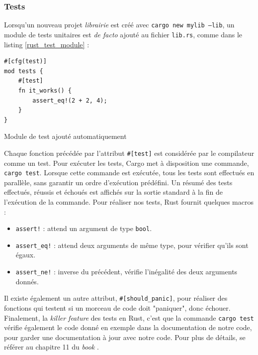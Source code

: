 \subsubsection{Tests}
Lorsqu'un nouveau projet \textit{librairie} est créé avec \texttt{cargo new mylib --lib}, 
un module de tests unitaires est \textit{de facto} ajouté au fichier \texttt{lib.rs}, 
comme dans le listing \ref{rust_test_module} :
\bigbreak
\begin{code}
    \begin{verbatim}
#[cfg(test)]
mod tests {
    #[test]
    fn it_works() {
        assert_eq!(2 + 2, 4);
    }
}
    \end{verbatim}
    \caption{Module de test ajouté automatiquement}
    \label{rust_test_module}
\end{code}
\bigbreak
Chaque fonction précédée par l'attribut \texttt{#[test]} est considérée par le compilateur 
comme un test. Pour exécuter les tests, Cargo met à disposition une commande, \texttt{cargo test}. 
Lorsque cette commande est exécutée, tous les tests sont effectués en parallèle, sans garantir un 
ordre d'exécution prédéfini. Un résumé des tests effectués, réussis et échoués est affichés sur la 
sortie standard à la fin de l'exécution de la commande. Pour réaliser nos tests, Rust fournit 
quelques macros :
\begin{itemize}
    \item \texttt{assert!} : attend un argument de type \texttt{bool}.
    \item \texttt{assert_eq!} : attend deux arguments de même type, pour vérifier qu'ils sont égaux.
    \item \texttt{assert_ne!} : inverse du précédent, vérifie l'inégalité des deux arguments donnés.
\end{itemize}
Il existe également un autre attribut, \texttt{#[should_panic]}, pour réaliser des 
fonctions qui testent si un morceau de code doit "paniquer", donc échouer. Finalement, la 
\textit{killer feature} des tests en Rust, c'est que la commande \texttt{cargo test} 
vérifie également le code donné en exemple dans la documentation de notre code, pour garder une 
documentation à jour avec notre code.
Pour plus de détails, se référer au chapitre 11 du \textit{book} \cite{ref0}.

